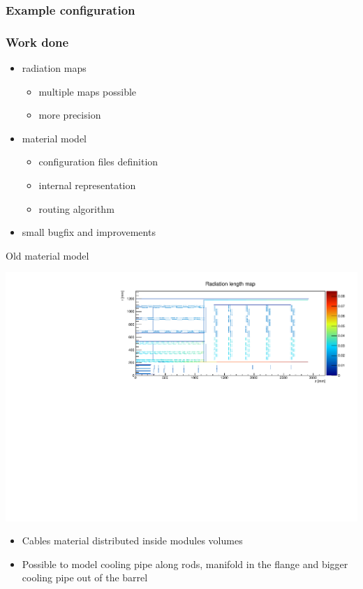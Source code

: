 \documentclass[pdftex, 11pt]{beamer}
\begin{document}
\begin{frame}
    \frametitle{Example configuration}
  
  \end{frame}

\begin{frame}
  \frametitle{Work done}
  \begin{itemize}
  \item \alert{radiation maps}
    \begin{itemize}
    \item multiple maps possible
    \item more precision
    \end{itemize}
  \item \alert{material} model
    \begin{itemize}
    \item configuration files definition
    \item internal representation
    \item routing algorithm
    \end{itemize}
  \item small bugfix and improvements
  \end{itemize}
\end{frame}

\begin{frame}{Old material model}
  \begin{center}
    \includegraphics[width=\textwidth]{img/oldModel.pdf}
  \end{center}
  \begin{itemize}
  \item Cables material distributed \alert{inside} modules volumes
  \item Possible to model \alert{cooling pipe} along rods, \alert{manifold} in the flange and bigger cooling pipe out of the barrel
  \end{itemize}
\end{frame}
\end{document}
